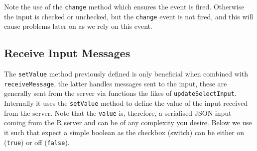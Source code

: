 \documentclass[
]{krantz}
\makeatletter
\newenvironment{Shaded}{\begin{snugshade}}{\end{snugshade}}
\newcommand{\AttributeTok}[1]{\textcolor[rgb]{0.61,0.61,0.61}{#1}}
\newcommand{\CommentTok}[1]{\textcolor[rgb]{0.37,0.37,0.37}{\textit{#1}}}
\newcommand{\ControlFlowTok}[1]{\textcolor[rgb]{0.27,0.27,0.27}{\textbf{#1}}}
\newcommand{\DataTypeTok}[1]{\textcolor[rgb]{0.27,0.27,0.27}{#1}}
\newcommand{\KeywordTok}[1]{\textcolor[rgb]{0.27,0.27,0.27}{\textbf{#1}}}
\newcommand{\NormalTok}[1]{#1}
\newcommand{\OperatorTok}[1]{\textcolor[rgb]{0.43,0.43,0.43}{\textbf{#1}}}
\newcommand{\StringTok}[1]{\textcolor[rgb]{0.5,0.5,0.5}{#1}}
\newcommand{\VariableTok}[1]{\textcolor[rgb]{0,0,0}{#1}}
\newenvironment{kframe}{%
\medskip{}
\setlength{\fboxsep}{.8em}
 \def\at@end@of@kframe{}%
 \ifinner\ifhmode%
  \def\at@end@of@kframe{\end{minipage}}%
  \begin{minipage}{\columnwidth}%
 \fi\fi%
 \def\FrameCommand##1{\hskip\@totalleftmargin \hskip-\fboxsep
 \colorbox{shadecolor}{##1}\hskip-\fboxsep
     \hskip-\linewidth \hskip-\@totalleftmargin \hskip\columnwidth}%
 \MakeFramed {\advance\hsize-\width
   \@totalleftmargin\z@ \linewidth\hsize
   \@setminipage}}%
 {\par\unskip\endMakeFramed%
 \at@end@of@kframe}
\renewenvironment{Shaded}{\begin{kframe}}{\end{kframe}}
\makeatother
\begin{document}
\begin{Shaded}
\end{Shaded}

Note the use of the \texttt{change} method which ensures the event is fired. Otherwise the input is checked or unchecked, but the \texttt{change} event is not fired, and this will cause problems later on as we rely on this event.

\hypertarget{shiny-input-receive-msg}{%
\subsection{Receive Input Messages}\label{shiny-input-receive-msg}}

The \texttt{setValue} method previously defined is only beneficial when combined with \texttt{receiveMessage}, the latter handles messages sent to the input, these are generally sent from the server via functions the likes of \texttt{updateSelectInput}. Internally it uses the \texttt{setValue} method to define the value of the input received from the server. Note that the \texttt{value} is, therefore, a serialised JSON input coming from the R server and can be of any complexity you desire. Below we use it such that expect a simple boolean as the checkbox (switch) can be either on (\texttt{true}) or off (\texttt{false}).
\end{document}
